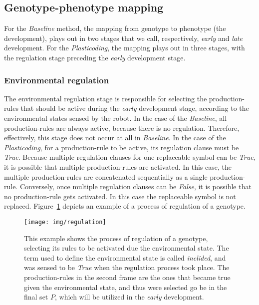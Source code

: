 \documentclass[utf8]{frontiersSCNS} %
\begin{document}
\subsection{Genotype-phenotype mapping}
 \label{sec:genopheno}
For the \textit{Baseline} method, the mapping from genotype to phenotype (the development), plays out in two stages that we call, respectively, \emph{early} and \emph{late} development. 
For the \textit{Plasticoding}, the mapping plays out in three stages, with the regulation stage preceding the \emph{early}  development stage.



\subsubsection{Environmental regulation}

The environmental regulation stage is responsible for selecting the production-rules that should be active during the \textit{early} development stage, according to the environmental states sensed by the robot. In the case of the \textit{Baseline}, all production-rules are always active, because there is no regulation. Therefore, effectively, this stage does not occur at all in \textit{Baseline}. In the case of the \textit{Plasticoding}, for a production-rule to be active, its regulation clause must be \textit{True}. Because multiple regulation clauses for one replaceable symbol can be \textit{True}, it is possible that multiple production-rules are activated. In this case, the multiple production-rules are concatenated sequentially as a single production-rule. Conversely, once multiple regulation clauses can be \textit{False}, it is possible that no production-rule gets activated. In this case the replaceable symbol is not replaced. Figure~\ref{fig:regulation} depicts an example of a process of regulation of a genotype.

 \begin{figure}[t]
\begin{center}
\texttt{[image: img/regulation]}
\caption{This example shows the process of regulation of a genotype, selecting its rules to be activated due the environmental state. The term used to define the environmental state is called \textit{inclided}, and was sensed to be \textit{True} when the regulation process took place. The production-rules in the second frame are the ones that became true given the environmental state, and thus were selected go be in the final set $P$, which will be utilized in the \textit{early} development.}
\label{fig:regulation}
\end{center}
\end{figure}
\end{document}
